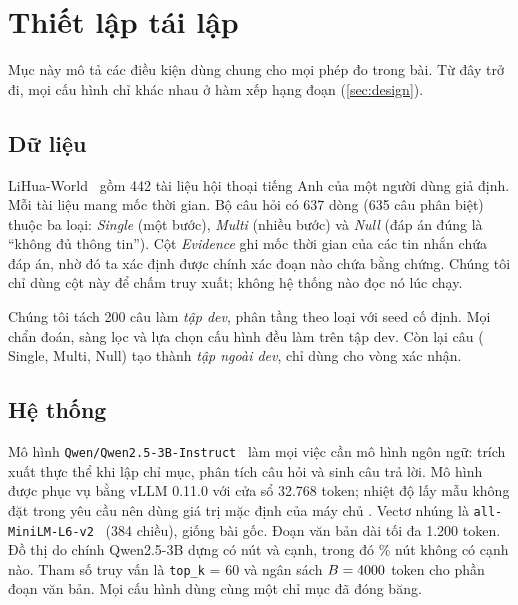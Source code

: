 \section{Thiết lập tái lập}\label{sec:setup}

Mục này mô tả các điều kiện dùng chung cho mọi phép đo trong bài.
Từ đây trở đi, mọi cấu hình chỉ khác nhau ở hàm xếp hạng đoạn (\cref{sec:design}).

\subsection{Dữ liệu}
LiHua-World~\cite{fan2025minirag} gồm 442 tài liệu hội thoại tiếng Anh của một người dùng giả định. Mỗi tài liệu mang mốc thời gian.
Bộ câu hỏi có 637 dòng (635 câu phân biệt) thuộc ba loại: \emph{Single} (một bước), \emph{Multi} (nhiều bước) và \emph{Null} (đáp án đúng là ``không đủ thông tin'').
Cột \emph{Evidence} ghi mốc thời gian của các tin nhắn chứa đáp án, nhờ đó ta xác định được chính xác đoạn nào chứa bằng chứng.
Chúng tôi chỉ dùng cột này để chấm truy xuất; không hệ thống nào đọc nó lúc chạy.

Chúng tôi tách 200 câu làm \emph{tập dev}, phân tầng theo loại với seed cố định.
Mọi chẩn đoán, sàng lọc và lựa chọn cấu hình đều làm trên tập dev.
Còn lại \nHeld{} câu (\nHeldSingle{} Single, \nHeldMulti{} Multi, \nHeldNull{} Null) tạo thành \emph{tập ngoài dev}, chỉ dùng cho vòng xác nhận.

\subsection{Hệ thống}
Mô hình \texttt{Qwen/Qwen2.5-3B-Instruct}~\cite{qwen2025qwen25} làm mọi việc cần mô hình ngôn ngữ: trích xuất thực thể khi lập chỉ mục, phân tích câu hỏi và sinh câu trả lời.
Mô hình được phục vụ bằng vLLM 0.11.0 với cửa sổ 32.768 token; nhiệt độ lấy mẫu không đặt trong yêu cầu nên dùng giá trị mặc định của máy chủ .
Vectơ nhúng là \texttt{all-MiniLM-L6-v2}~\cite{reimers2019sbert,wang2020minilm} (384 chiều), giống bài gốc.
Đoạn văn bản dài tối đa 1.200 token. Đồ thị do chính Qwen2.5-3B dựng có \graphNodes{} nút và \graphEdges{} cạnh, trong đó \graphIsolated\% nút không có cạnh nào.
Tham số truy vấn là \texttt{top\_k} = 60 và ngân sách $B = 4000$ token cho phần đoạn văn bản.
Mọi cấu hình dùng cùng một chỉ mục đã đóng băng.


